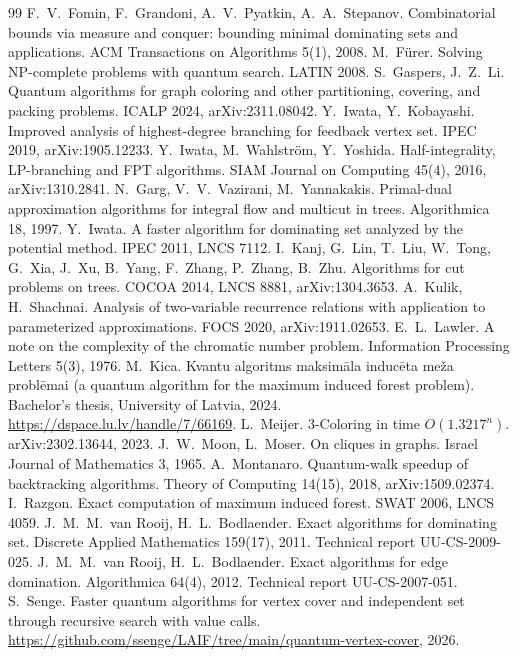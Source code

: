 \documentclass[11pt]{article}
\theoremstyle{remark}
\begin{document}
\begin{thebibliography}{99}
 F.~V.~Fomin, F.~Grandoni, A.~V.~Pyatkin, A.~A.~Stepanov. Combinatorial bounds via measure and conquer: bounding minimal dominating sets and applications. ACM Transactions on Algorithms 5(1), 2008.
 M.~F\"urer. Solving NP-complete problems with quantum search. LATIN 2008.
 S.~Gaspers, J.~Z.~Li. Quantum algorithms for graph coloring and other partitioning, covering, and packing problems. ICALP 2024, arXiv:2311.08042.
 Y.~Iwata, Y.~Kobayashi. Improved analysis of highest-degree branching for feedback vertex set. IPEC 2019, arXiv:1905.12233.
 Y.~Iwata, M.~Wahlstr{\"o}m, Y.~Yoshida. Half-integrality, LP-branching and FPT algorithms. SIAM Journal on Computing 45(4), 2016, arXiv:1310.2841.
 N.~Garg, V.~V.~Vazirani, M.~Yannakakis. Primal-dual approximation algorithms for integral flow and multicut in trees. Algorithmica 18, 1997.
 Y.~Iwata. A faster algorithm for dominating set analyzed by the potential method. IPEC 2011, LNCS 7112.
 I.~Kanj, G.~Lin, T.~Liu, W.~Tong, G.~Xia, J.~Xu, B.~Yang, F.~Zhang, P.~Zhang, B.~Zhu. Algorithms for cut problems on trees. COCOA 2014, LNCS 8881, arXiv:1304.3653.
 A.~Kulik, H.~Shachnai. Analysis of two-variable recurrence relations with application to parameterized approximations. FOCS 2020, arXiv:1911.02653.
 E.~L.~Lawler. A note on the complexity of the chromatic number problem. Information Processing Letters 5(3), 1976.
 M.~Kica. Kvantu algoritms maksim\=ala induc\=eta me\v{z}a probl\=emai (a quantum algorithm for the maximum induced forest problem). Bachelor's thesis, University of Latvia, 2024. \url{https://dspace.lu.lv/handle/7/66169}.
 L.~Meijer. 3-Coloring in time $O(1.3217^n)$. arXiv:2302.13644, 2023.
 J.~W.~Moon, L.~Moser. On cliques in graphs. Israel Journal of Mathematics 3, 1965.
 A.~Montanaro. Quantum-walk speedup of backtracking algorithms. Theory of Computing 14(15), 2018, arXiv:1509.02374.
 I.~Razgon. Exact computation of maximum induced forest. SWAT 2006, LNCS 4059.
 J.~M.~M.~van Rooij, H.~L.~Bodlaender. Exact algorithms for dominating set. Discrete Applied Mathematics 159(17), 2011. Technical report UU-CS-2009-025.
 J.~M.~M.~van Rooij, H.~L.~Bodlaender. Exact algorithms for edge domination. Algorithmica 64(4), 2012. Technical report UU-CS-2007-051.
 S.~Senge. Faster quantum algorithms for vertex cover and independent set through recursive search with value calls. \url{https://github.com/ssenge/LAIF/tree/main/quantum-vertex-cover}, 2026.

\end{thebibliography}
\end{document}
